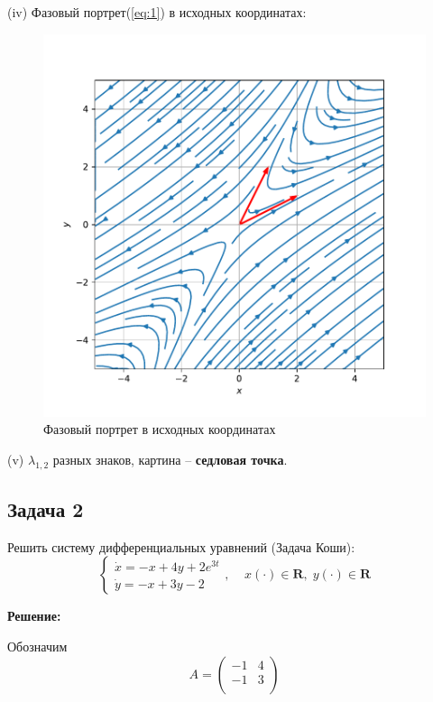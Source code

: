 \documentclass[a4paper, 12pt]{article}
\begin{document}
(iv) Фазовый портрет(\ref{eq:1}) в исходных координатах:

\begin{figure}[H]
	\centering
	\includegraphics[scale=0.7]{1a1_1}
	\caption{Фазовый портрет в исходных координатах}
	\label{im:1a1_1}
\end{figure}

(v) $\lambda_{1,2}$ разных знаков, картина -- \textbf{седловая точка}.







	\subsection* {Задача 2}
 Решить систему дифференциальных уравнений (Задача Коши): 
\begin{equation}
\left\{
\begin{array}{lr}
\dot{x} = -x+4y+2e^{3t}\\
\dot{y} = -x+3y-2
\end{array}
\right.
, \;\;\;\; x(\cdot)\in \textbf{R},\; y(\cdot)\in \textbf{R}
\label{eq:2}
\end{equation}

\textbf{Решение:} \par
Обозначим 
\[
A = \left(
\begin{array}{cc}
-1 & 4\\
-1 & 3\\
\end{array}
\right)\]
\end{document}
